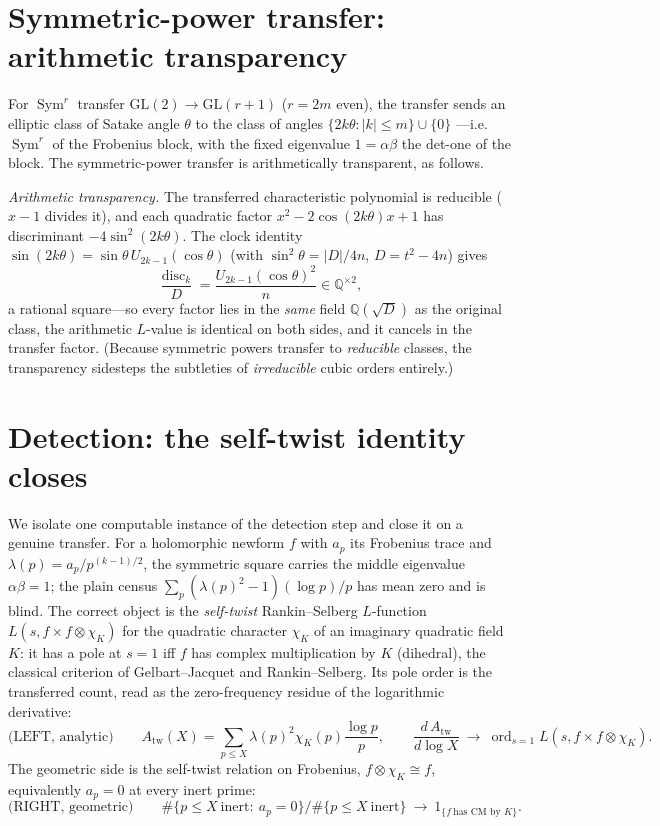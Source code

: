 \documentclass[11pt]{article}
\theoremstyle{definition}
\newcommand{\ord}{\operatorname{ord}}
\newcommand{\Sym}{\operatorname{Sym}}
\begin{document}
\section{Symmetric-power transfer: arithmetic transparency}\label{sec:fl}

For $\Sym^r$ transfer $\mathrm{GL}(2)\to\mathrm{GL}(r+1)$ ($r=2m$ even), the transfer sends an
elliptic class of Satake angle $\theta$ to the class of angles $\{2k\theta:|k|\le m\}\cup\{0\}$
---i.e. $\Sym^r$ of the Frobenius block, with the fixed eigenvalue $1=\alpha\beta$ the det-one of
the block. The symmetric-power transfer is arithmetically transparent, as follows.

\emph{Arithmetic transparency.} The transferred characteristic polynomial is reducible ($x-1$
divides it), and each quadratic factor $x^2-2\cos(2k\theta)x+1$ has discriminant $-4\sin^2(2k\theta)$.
The clock identity $\sin(2k\theta)=\sin\theta\,U_{2k-1}(\cos\theta)$ (with $\sin^2\theta=|D|/4n$,
$D=t^2-4n$) gives
\[
  \frac{\operatorname{disc}_k}{D}=\frac{U_{2k-1}(\cos\theta)^2}{n}\in\mathbb Q^{\times2},
\]
a rational square---so every factor lies in the \emph{same} field $\mathbb Q(\sqrt D)$ as the
original class, the arithmetic $L$-value is identical on both sides, and it cancels in the transfer
factor. (Because symmetric powers transfer to \emph{reducible} classes, the transparency sidesteps the
subtleties of \emph{irreducible} cubic orders entirely.)

\section{Detection: the self-twist identity closes}\label{sec:detect}

We isolate one computable instance of the detection step and close it on a genuine transfer. For a
holomorphic newform $f$ with $a_p$ its Frobenius trace and $\lambda(p)=a_p/p^{(k-1)/2}$, the
symmetric square carries the middle eigenvalue $\alpha\beta=1$; the plain census
$\sum_p(\lambda(p)^2-1)(\log p)/p$ has mean zero and is blind. The correct object is the
\emph{self-twist} Rankin--Selberg $L$-function $L(s,f\times f\otimes\chi_K)$ for the quadratic
character $\chi_K$ of an imaginary quadratic field $K$: it has a pole at $s=1$ iff $f$ has complex
multiplication by $K$ (dihedral), the classical criterion of Gelbart--Jacquet \cite{GJ} and
Rankin--Selberg.
Its pole order is the transferred count, read as the zero-frequency residue of the logarithmic
derivative:
\[
  \text{(LEFT, analytic)}\qquad
  A_{\mathrm{tw}}(X)=\sum_{p\le X}\lambda(p)^2\chi_K(p)\frac{\log p}{p},\qquad
  \frac{d\,A_{\mathrm{tw}}}{d\log X}\ \longrightarrow\ \ord_{s=1}L(s,f\times f\otimes\chi_K).
\]
The geometric side is the self-twist relation on Frobenius, $f\otimes\chi_K\cong f$, equivalently
$a_p=0$ at every inert prime:
\[
  \text{(RIGHT, geometric)}\qquad
  \#\{p\le X\ \text{inert}:\ a_p=0\}\big/\#\{p\le X\ \text{inert}\}\ \longrightarrow\ 1_{\{f\ \text{has CM by }K\}}.
\]
\end{document}
